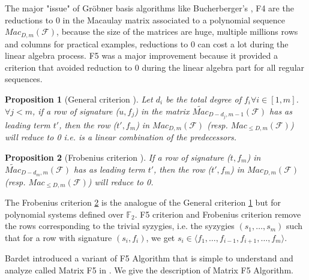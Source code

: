 \documentclass[english]{article}
\newtheorem{proposition}{Proposition}[section]
\newcommand{\Mac}[3]{{Mac_{#1, #2}(\mathcal{#3})}}
\newcommand{\Mact}[3]{{\widetilde{Mac}_{#1, #2}(\mathcal{#3})}}
\begin{document}
		The major "issue" of Gröbner basis algorithms like Bucherberger's \cite{Buc}, F4 \cite{F02} are the reductions to 0 in the Macaulay matrix associated to a polynomial sequence $\Mac{D}{m}{F}$, because the size of the matrices are huge, multiple millions rows and columns for practical examples,
		reductions to 0 can cost a lot during the linear algebra process. F5 \cite{F02} was a major improvement because it provided a criterion that avoided reduction to 0 during the linear algebra part for all regular sequences.
		
		\begin{proposition}[General criterion \cite{F02}]
			\label{F5Crit}
			Let $d_i$ be the total degree of $f_i \forall i \in [1,m]$.
			$\forall j < m$, if a row of signature ($u, f_j$) in the matrix $\Mact{D-d_j}{m-1}{F}$ has as leading term $t'$, then the row ($t', f_m$) in $\Mac{D}{m}{F}$ (resp. $\Mac{\leq D}{m}{F}$) will reduce to 0 i.e. is a linear combination of the predecessors.
		\end{proposition}
		
		\begin{proposition}[Frobenius criterion \cite{F02}]
			\label{Frob}
			If a row of signature ($t, f_m$) in $\Mact{D - d_m}{m}{F}$ has as leading term $t'$, then the row ($t', f_m$) in $\Mac{D}{m}{F}$ (resp. $\Mac{\leq D}{m}{F}$) will reduce to 0.
		\end{proposition}
		
		The Frobenius criterion \ref{Frob} is the analogue of the General criterion \ref{F5Crit} but for polynomial systems defined over $\mathbb{F}_2$.
		F5 criterion and Frobenius criterion remove the rows corresponding to the trivial syzygies, i.e. the syzygies $(s_1, \dots, s_m)$ such that for a row with signature $(s_i, f_i)$, we get $s_i \in \langle f_1,\dots,f_{i-1},f_{i+1},\dots,f_m \rangle$.
		
		Bardet introduced a variant of F5 Algorithm that is simple to understand and analyze called Matrix F5 in \cite{Bardet04}.
		We give the description of Matrix F5 Algorithm.
		
\end{document}
